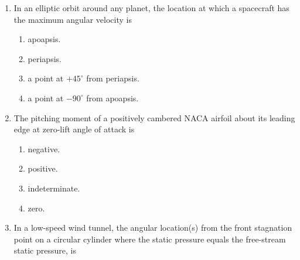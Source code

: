 \documentclass[journal,12pt,onecolumn]{IEEEtran}
\theoremstyle{remark}
\begin{document}
\begin{enumerate}
    \begin{enumerate}
    \end{enumerate}

    \item In an elliptic orbit around any planet, the location at which a spacecraft has the maximum angular velocity is
    \hfill{}

    \begin{enumerate}
        \item apoapsis.
        \item periapsis.
        \item a point at $+45^{\circ}$ from periapsis.
        \item a point at $-90^{\circ}$ from apoapsis.
    \end{enumerate}

    \item The pitching moment of a positively cambered NACA airfoil about its leading edge at zero-lift angle of attack is
    \hfill{}

    \begin{enumerate}
        \item negative.
        \item positive.
        \item indeterminate.
        \item zero.
    \end{enumerate}

    \item In a low-speed wind tunnel, the angular location(s) from the front stagnation point on a circular cylinder where the static pressure equals the free-stream static pressure, is
    \hfill{}

    \begin{enumerate}
    \end{enumerate}


\end{enumerate}
\end{document}
